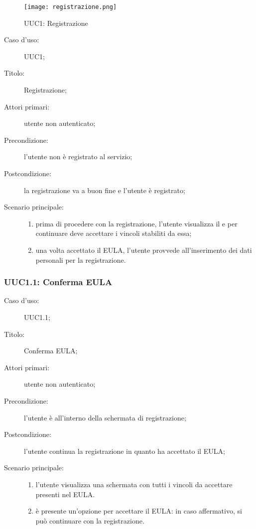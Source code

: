\documentclass[../../../analisi-dei-requisiti.tex]{subfiles}
\begin{document}
\begin{figure}[H]
  \centering
  \texttt{[image: registrazione.png]}
  \caption{UUC1: Registrazione}%
  \label{fig:uuc1}
\end{figure}

\begin{description}
  \item[Caso d’uso:] UUC1;
  \item[Titolo:] Registrazione;
  \item[Attori primari:] utente non autenticato;
  \item[Precondizione:] l'utente non è registrato al servizio;
  \item[Postcondizione:] la registrazione va a buon fine e l'utente è registrato;
  \item[Scenario principale:]
        \begin{enumerate}
          \item prima di procedere con la registrazione, l'utente visualizza il  e per continuare deve accettare i vincoli stabiliti da essa;
          \item una volta accettato il EULA, l'utente provvede all'inserimento dei dati personali per la registrazione.
        \end{enumerate}
\end{description}

\subsubsection{UUC1.1: Conferma EULA}%
\label{subs:UUC1.1}
\begin{description}
  \item[Caso d’uso:] UUC1.1;
  \item[Titolo:] Conferma EULA\@;
  \item[Attori primari:] utente non autenticato;
  \item[Precondizione:] l'utente è all'interno della schermata di registrazione;
  \item[Postcondizione:] l'utente continua la registrazione in quanto ha accettato il EULA\@;
  \item[Scenario principale:]
        \begin{enumerate}
          \item l'utente visualizza una schermata con tutti i vincoli da accettare presenti nel EULA\@.
          \item è presente un'opzione per accettare il EULA\@: in caso affermativo, si può continuare con la registrazione.
        \end{enumerate}
\end{description}
\end{document}
